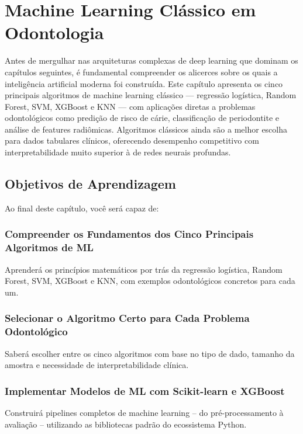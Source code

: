 
\chapter{Machine Learning Clássico em Odontologia}
\label{cap:ml-classico}

\nivelbasico

Antes de mergulhar nas arquiteturas complexas de deep learning que dominam os capítulos seguintes, é fundamental compreender os alicerces sobre os quais a inteligência artificial moderna foi construída. Este capítulo apresenta os cinco principais algoritmos de machine learning clássico — regressão logística, Random Forest, SVM, XGBoost e KNN — com aplicações diretas a problemas odontológicos como predição de risco de cárie, classificação de periodontite e análise de features radiômicas. Algoritmos clássicos ainda são a melhor escolha para dados tabulares clínicos, oferecendo desempenho competitivo com interpretabilidade muito superior à de redes neurais profundas.

\section{Objetivos de Aprendizagem}

Ao final deste capítulo, você será capaz de:

\subsection{Compreender os Fundamentos dos Cinco Principais Algoritmos de ML}
Aprenderá os princípios matemáticos por trás da regressão logística, Random Forest, SVM, XGBoost e KNN, com exemplos odontológicos concretos para cada um.

\subsection{Selecionar o Algoritmo Certo para Cada Problema Odontológico}
Saberá escolher entre os cinco algoritmos com base no tipo de dado, tamanho da amostra e necessidade de interpretabilidade clínica.

\subsection{Implementar Modelos de ML com Scikit-learn e XGBoost}
Construirá pipelines completos de machine learning -- do pré-processamento à avaliação -- utilizando as bibliotecas padrão do ecossistema Python.

